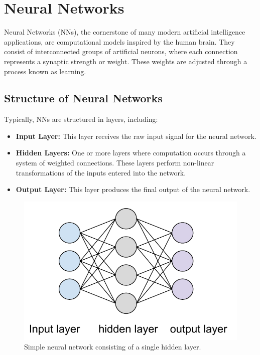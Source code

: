 


\section{Neural Networks}
Neural Networks (NNs), the cornerstone of many modern artificial intelligence applications, are computational models inspired by the human brain. They consist of interconnected groups of artificial neurons, where each connection represents a synaptic strength or weight. These weights are adjusted through a process known as learning. 



\subsection{Structure of Neural Networks}
Typically, NNs are structured in layers, including:
\begin{itemize}
    \item \textbf{Input Layer:} This layer receives the raw input signal for the neural network.
    \item \textbf{Hidden Layers:} One or more layers where computation occurs through a system of weighted connections. These layers perform non-linear transformations of the inputs entered into the network.
    \item \textbf{Output Layer:} This layer produces the final output of the neural network.
\end{itemize}

\begin{figure}[H]
    \includegraphics[scale=0.7]{figures/figure-pdf/NN.pdf}
    \caption{Simple neural network consisting of a single hidden layer.}
\end{figure}

